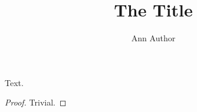 \documentclass{cc}
\title{The Title}
\author{Ann Author}
\begin{document}
\maketitle
Text.
\begin{proof}
Trivial.
\end{proof}
\end{document}
